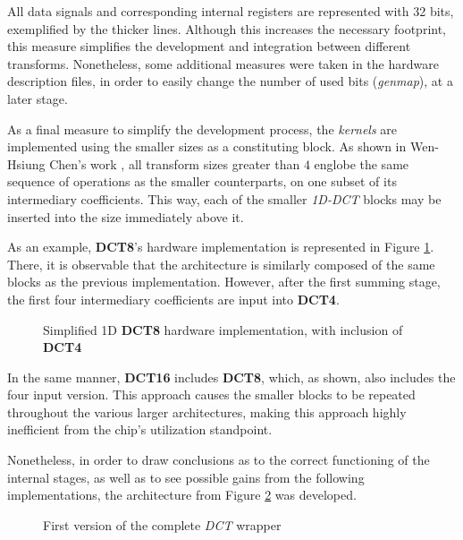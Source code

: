 All data signals and corresponding internal registers are represented with 32 bits, exemplified by the thicker lines. Although this increases the necessary footprint, this measure simplifies the development and integration between different transforms. Nonetheless, some additional measures were taken in the hardware description files, in order to easily change the number of used bits (\emph{\gls{genmap}}), at a later stage.

As a final measure to simplify the development process, the \emph{kernels} are implemented using the smaller sizes as a constituting block. As shown in Wen-Hsiung Chen's work \cite{wen-hsiungchenFastComputationalAlgorithm1977}, all transform sizes greater than $4$ englobe the same sequence of operations as the smaller counterparts, on one subset of its intermediary coefficients. This way, each of the smaller \emph{1D-DCT} blocks may be inserted into the size immediately above it.

As an example, \textbf{DCT8}'s hardware implementation is represented in Figure \ref{fig:harddct8v1}. There, it is observable that the architecture is similarly composed of the same blocks as the previous implementation. However, after the first summing stage, the first four intermediary coefficients are input into \textbf{DCT4}. 

\begin{figure}[!htbp]
    \centering
    
    \caption{Simplified 1D \textbf{DCT8} hardware implementation, with inclusion of \textbf{DCT4}}
    \label{fig:harddct8v1}
\end{figure}

In the same manner, \textbf{DCT16} includes \textbf{DCT8}, which, as shown, also includes the four input version. This approach causes the smaller blocks to be repeated throughout the various larger architectures, making this approach highly inefficient from the chip's utilization standpoint.

Nonetheless, in order to draw conclusions as to the correct functioning of the internal stages, as well as to see possible gains from the following implementations, the architecture from Figure \ref{fig:fullv1} was developed.

\begin{figure}[!htbp]
    \centering
    
    \caption{First version of the complete \emph{DCT} wrapper}
    \label{fig:fullv1}
\end{figure}

